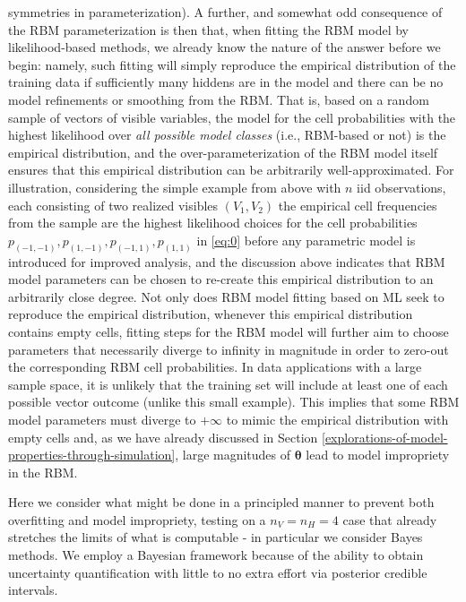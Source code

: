 \documentclass[]{article}
\theoremstyle{definition}
\newcommand{\nv}{{n_{\scriptscriptstyle V}}}
\newcommand{\nh}{{n_{\scriptscriptstyle H}}}
\begin{document}
symmetries in parameterization). A further, and somewhat odd consequence
of the RBM parameterization is then that, when fitting the RBM model by
likelihood-based methods, we already know the nature of the answer
before we begin: namely, such fitting will simply reproduce the
empirical distribution of the training data if sufficiently many hiddens
are in the model and there can be no model refinements or smoothing from
the RBM. That is, based on a random sample of vectors of visible
variables, the model for the cell probabilities with the highest
likelihood over \emph{all possible model classes} (i.e., RBM-based or
not) is the empirical distribution, and the over-parameterization of the
RBM model itself ensures that this empirical distribution can be
arbitrarily well-approximated. For illustration, considering the simple
example from above with \(n\) iid observations, each consisting of two
realized visibles \((V_1,V_2)\) the empirical cell frequencies from the
sample are the highest likelihood choices for the cell probabilities
\(p_{(-1,-1)},p_{(1,-1)}, p_{(-1,1)},p_{(1,1)}\) in \eqref{eq:0} before
any parametric model is introduced for improved analysis, and the
discussion above indicates that RBM model parameters can be chosen to
re-create this empirical distribution to an arbitrarily close degree.
Not only does RBM model fitting based on ML seek to reproduce the
empirical distribution, whenever this empirical distribution contains
empty cells, fitting steps for the RBM model will further aim to choose
parameters that necessarily diverge to infinity in magnitude in order to
zero-out the corresponding RBM cell probabilities. In data applications
with a large sample space, it is unlikely that the training set will
include at least one of each possible vector outcome (unlike this small
example). This implies that some RBM model parameters must diverge to
\(+\infty\) to mimic the empirical distribution with empty cells and, as
we have already discussed in Section
\ref{explorations-of-model-properties-through-simulation}, large
magnitudes of \(\boldsymbol \theta\) lead to model impropriety in the
RBM.

Here we consider what might be done in a principled manner to prevent
both overfitting and model impropriety, testing on a \(\nv = \nh = 4\)
case that already stretches the limits of what is computable - in
particular we consider Bayes methods. We employ a Bayesian framework
because of the ability to obtain uncertainty quantification with little
to no extra effort via posterior credible intervals.
\end{document}
